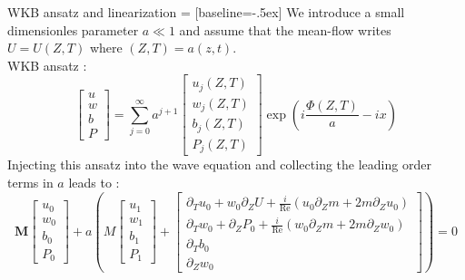 \documentclass[10pt]{beamer}
\begin{document}
\begin{frame}[fragile]{WKB ansatz and linearization}
   = [baseline=-.5ex]
  We introduce a small dimensionles parameter $a\ll1$ and assume that the mean\--flow writes $U=U\left(Z,T\right)$ where $\left(Z,T\right)=a\left(z,t\right)$.\\
  WKB ansatz :
  \begin{equation*}
    \begin{bmatrix}u\\w\\b\\P\end{bmatrix}=\sum_{j=0}^{\infty}a^{j+1}\begin{bmatrix}u_{j}\left(Z,T\right)\\w_{j}\left(Z,T\right)\\b_{j}\left(Z,T\right)\\P_{j}\left(Z,T\right)\end{bmatrix}\exp\left(i\frac{\Phi\left(Z,T\right)}{a}-ix \right)
  \end{equation*}
  Injecting this ansatz into the wave equation and collecting the leading order terms in $a$ leads to :
  \begin{equation*}\!\!\!\!\!
  	\mathbf{M}\begin{bmatrix}u_{0}\\w_{0}\\b_{0}\\P_{0}\end{bmatrix}+a\left(M\begin{bmatrix}u_{1}\\w_{1}\\b_{1}\\P_{1}\end{bmatrix}+
  	\begin{bmatrix}
  	\partial_{T}u_{0}+w_{0}\partial_{Z}U+\frac{i}{\mathrm{Re}}\left(u_{0}\partial_{Z}m+2m\partial_{Z}u_{0} \right)\\
  	\partial_{T}w_{0}+\partial_{Z}P_{0}+\frac{i}{\mathrm{Re}}\left(w_{0}\partial_{Z}m+2m\partial_{Z}w_{0} \right)\\
  	\partial_{T}b_{0}\\
  	\partial_{Z}w_{0}\end{bmatrix} \right) =0
  \end{equation*}
\end{frame}
\end{document}

